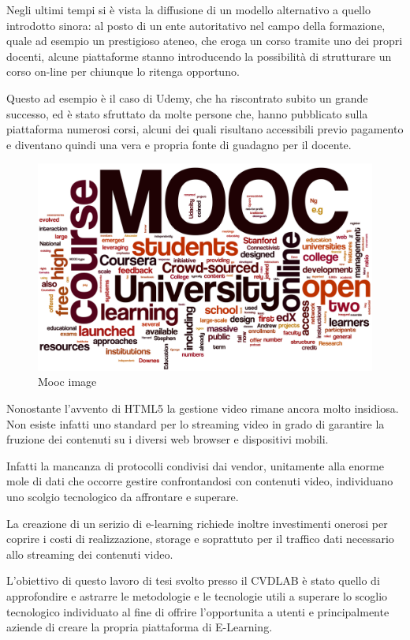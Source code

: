 Negli ultimi tempi si è vista la diffusione di un modello alternativo a quello introdotto sinora: al posto di un ente autoritativo nel campo della formazione, quale ad esempio un prestigioso ateneo, che eroga un corso tramite uno dei propri docenti, alcune piattaforme stanno introducendo la possibilità di strutturare un corso on-line per chiunque lo ritenga opportuno.

Questo ad esempio è il caso di Udemy, che ha riscontrato subito un grande successo, ed è stato sfruttato da molte persone che, hanno pubblicato sulla piattaforma numerosi corsi, alcuni dei quali risultano accessibili previo pagamento e diventano quindi una vera e propria fonte di guadagno per il docente.

\begin{figure}[htb] %
 \centering
 \includegraphics[width=0.7\linewidth]{images/introduction/mooc.png}\hfill
 \caption[Mooc image]{Mooc image}
 \label{fig:fourV}
\end{figure}


Nonostante l'avvento di HTML5 la gestione video rimane ancora molto insidiosa. Non esiste infatti uno standard per lo streaming video in grado di garantire la fruzione dei contenuti su i diversi web browser e dispositivi mobili.

Infatti la mancanza di protocolli condivisi dai vendor, unitamente alla enorme mole di dati che occorre gestire confrontandosi con contenuti video, individuano uno scolgio tecnologico da affrontare e superare.

La creazione di un serizio di e-learning richiede inoltre investimenti onerosi per coprire i costi di realizzazione, storage e soprattuto per il traffico dati necessario allo streaming dei contenuti video.


L'obiettivo di questo lavoro di tesi svolto presso il CVDLAB è stato quello di approfondire e astrarre le metodologie e le tecnologie utili a superare lo scoglio tecnologico individuato al fine di offrire l'opportunita a utenti e principalmente aziende di creare la propria piattaforma di E-Learning.

